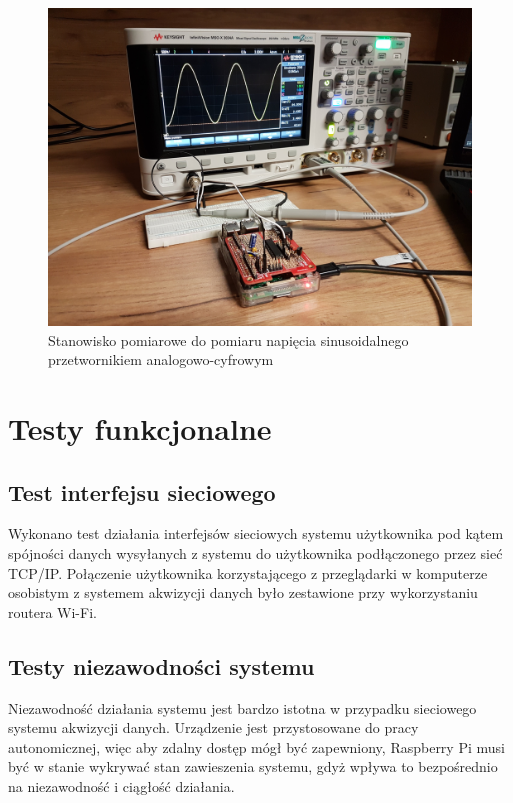 \begin{figure}[h]
	\centering
		\includegraphics[width=13cm]{stanowisko}
	\caption{Stanowisko pomiarowe do pomiaru napięcia sinusoidalnego przetwornikiem analogowo-cyfrowym} 
	\label{pic:stanowisko}
\end{figure}


\section{Testy funkcjonalne}


\subsection{Test interfejsu sieciowego}

Wykonano test działania interfejsów sieciowych systemu użytkownika pod kątem spójności danych wysyłanych z systemu do użytkownika podłączonego przez sieć TCP/IP. Połączenie użytkownika korzystającego z przeglądarki w komputerze osobistym z systemem akwizycji danych było zestawione przy wykorzystaniu routera Wi-Fi.
 


\subsection{Testy niezawodności systemu}

Niezawodność działania systemu jest bardzo istotna w przypadku sieciowego systemu akwizycji danych. Urządzenie jest przystosowane do pracy autonomicznej, więc aby zdalny dostęp mógł być zapewniony, Raspberry Pi musi być w stanie wykrywać stan zawieszenia systemu, gdyż wpływa to bezpośrednio na niezawodność i ciągłość działania. 

